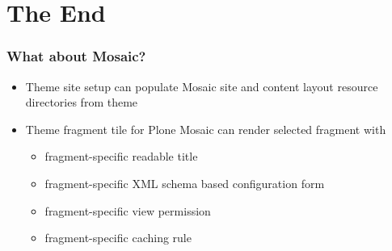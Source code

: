 \documentclass[aspectratio=43]{beamer}
\begin{document}
\section{The End}

{
%
\begin{frame}[plain,t]
  \vfill
  \centering
  \Huge
  \bfseries
  \lsstyle
  \par
  \vspace{0.5cm}
  \Large
  \contourlength{1.00pt}
\end{frame}
}

\begin{frame}[plain,t]
  \frametitle{What about Mosaic?}
  \begin{itemize}
  \setlength{\itemsep}{1em}
  \item Theme site setup can populate Mosaic site and content layout
  resource directories from theme
  \item Theme fragment tile for Plone Mosaic
  can render selected fragment with
  \vspace{1em}
  \begin{itemize}
  \setlength{\itemsep}{1em}
  \item fragment-specific readable title
  \item fragment-specific XML schema based configuration form
  \item fragment-specific view permission
  \item fragment-specific caching rule
  \end{itemize}
  \end{itemize}
\end{frame}
\end{document}
